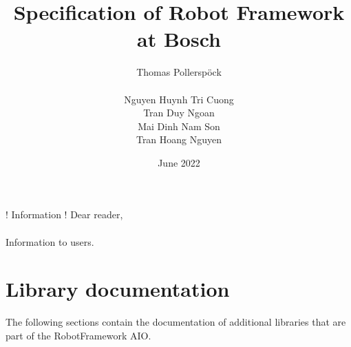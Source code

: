 \documentclass[a4paper,10pt]{report}
\begin{document}
\author{Thomas Pollerspöck \\ \\ Nguyen Huynh Tri Cuong \\ Tran Duy Ngoan \\ Mai Dinh Nam Son \\ Tran Hoang Nguyen}
\title{Specification of Robot Framework at Bosch}
\date{June 2022}


\maketitle

\begin{boxinfo}{! Information !}{
Dear reader, \\
\\
Information to users.
}
\end{boxinfo}

\tableofcontents

\listoftodos





\chapter{Library documentation}

The following sections contain the documentation of additional libraries that are part of the RobotFramework AIO.



\end{document}
